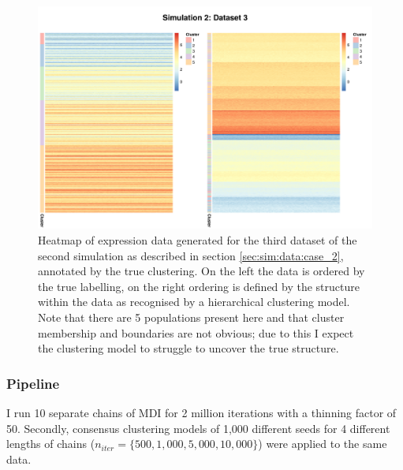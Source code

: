 \documentclass[12pt]{article} %
\begin{document}
	\begin{figure} %
		\centering
		\includegraphics[scale=0.7]{Images/Gen_data/Case_2/dataset_3_comp_clustered_unclustered.png}
		\caption{Heatmap of expression data generated for the third dataset of the second simulation as described in section \ref{sec:sim:data:case_2}, annotated by the true clustering. On the left the data is ordered by the true labelling, on the right ordering is defined by the structure within the data as recognised by a hierarchical clustering model. Note that there are 5 populations present here and that cluster membership and boundaries are not obvious; due to this I expect the clustering model to struggle to uncover the true structure.}
		\label{fig:gen_data_3_sim_case_2}
	\end{figure}


	\subsubsection{Pipeline} \label{sec:simulation_pipeline}
	I run 10 separate chains of MDI for 2 million iterations with a thinning factor of 50. Secondly, consensus clustering models of 1,000 different seeds for 4 different lengths of chains ($n_{iter} = \{500, 1,000, 5,000, 10,000\}$) were applied to the same data.
	
\end{document}
